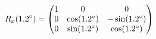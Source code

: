 \documentclass[preview]{standalone}
\begin{document}
\begin{align*}
\special{dvisvgm:raw <g id='unique000'>}R_x(1.2^\circ) = \begin{pmatrix} 1 & 0 & 0 \\ 0 & \cos(1.2^\circ) & -\sin(1.2^\circ) \\ 0 & \sin(1.2^\circ) & \cos(1.2^\circ) \end{pmatrix}\special{dvisvgm:raw </g>}
\end{align*}
\end{document}
